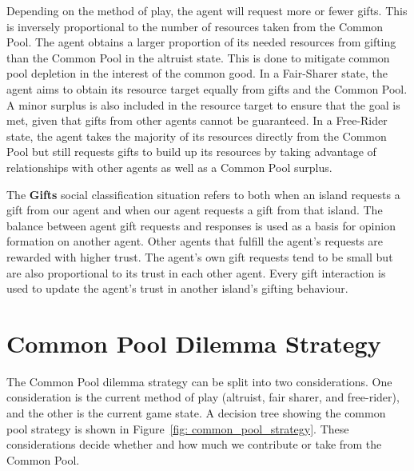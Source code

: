 \begin{figure}[!htb]
\end{figure}



Depending on the method of play, the agent will request more or fewer gifts. This is inversely proportional to the number of resources taken from the Common Pool. The agent obtains a larger proportion of its needed resources from gifting than the Common Pool in the altruist state. This is done to mitigate common pool depletion in the interest of the common good. In a Fair-Sharer state, the agent aims to obtain its resource target equally from gifts and the Common Pool. A minor surplus is also included in the resource target to ensure that the goal is met, given that gifts from other agents cannot be guaranteed. In a Free-Rider state, the agent takes the majority of its resources directly from the Common Pool but still requests gifts to build up its resources by taking advantage of relationships with other agents as well as a Common Pool surplus.

The \textbf{Gifts} social classification situation refers to both when an island requests a gift from our agent and when our agent requests a gift from that island. The balance between agent gift requests and responses is used as a basis for opinion formation on another agent. Other agents that fulfill the agent's requests are rewarded with higher trust. The agent's own gift requests tend to be small but are also proportional to its trust in each other agent. Every gift interaction is used to update the agent's trust in another island's gifting behaviour.

\section{Common Pool Dilemma Strategy} \label{sec:Common Pool Dilemma Strategy}
The Common Pool dilemma strategy can be split into two considerations. One consideration is the current method of play (altruist, fair sharer, and free-rider), and the other is the current game state. A decision tree showing the common pool strategy is shown in Figure~\ref{fig: common_pool_strategy}. These considerations decide whether and how much we contribute or take from the Common Pool.

